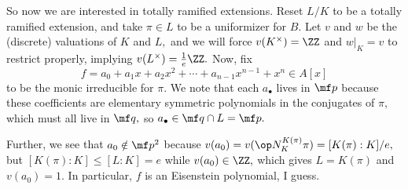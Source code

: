 So now we are interested in totally ramified extensions. Reset $L/K$ to be a totally ramified extension, and take $\pi\in L$ to be a uniformizer for $B.$ Let $v$ and $w$ be the (discrete) valuations of $K$ and $L,$ and we will force $v(K^\times)=\ZZ$ and $w|_K=v$ to restrict properly, implying $v(L^\times)=\frac1e\ZZ.$ Now, fix
\[f=a_0+a_1x+a_2x^2+\cdots+a_{n-1}x^{n-1}+x^n\in A[x]\]
to be the monic irreducible for $\pi.$ We note that each $a_\bullet$ lives in $\mf p$ because these coefficients are elementary symmetric polynomials in the conjugates of $\pi,$ which must all live in $\mf q,$ so $a_\bullet\in\mf q\cap L=\mf p.$

Further, we see that $a_0\notin\mf p^2$ because $v(a_0)=v(\op N_K^{K(\pi)}\pi)=[K(\pi):K]/e,$ but $[K(\pi):K]\le[L:K]=e$ while $v(a_0)\in\ZZ,$ which gives $L=K(\pi)$ and $v(a_0)=1.$ In particular, $f$ is an Eisenstein polynomial, I guess.

